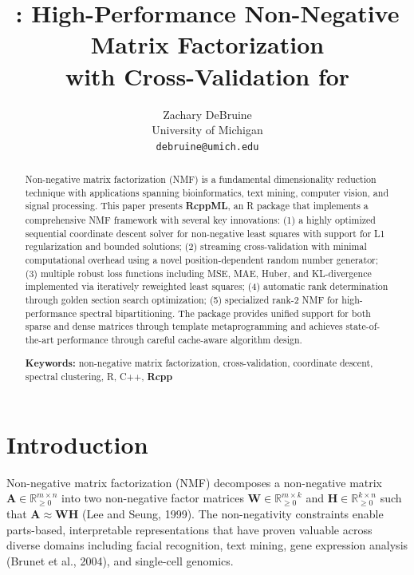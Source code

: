 \documentclass[11pt]{article}
\title{\pkg{RcppML}: High-Performance Non-Negative Matrix Factorization\\
with Cross-Validation for \proglang{R}}
\author{Zachary DeBruine\\
University of Michigan\\
\texttt{debruine@umich.edu}}
\date{}
\newcommand{\proglang}[1]{\textsf{#1}}
\newcommand{\pkg}[1]{\textbf{#1}}
\begin{document}
\maketitle

\begin{abstract}
Non-negative matrix factorization (NMF) is a fundamental dimensionality 
reduction technique with applications spanning bioinformatics, text mining, 
computer vision, and signal processing. This paper presents \pkg{RcppML}, an 
\proglang{R} package that implements a comprehensive NMF framework with several 
key innovations: (1) a highly optimized sequential coordinate descent solver for 
non-negative least squares with support for L1 regularization and bounded 
solutions; (2) streaming cross-validation with minimal computational overhead 
using a novel position-dependent random number generator; (3) multiple robust 
loss functions including MSE, MAE, Huber, and KL-divergence implemented via 
iteratively reweighted least squares; (4) automatic rank determination through 
golden section search optimization; (5) specialized rank-2 NMF for 
high-performance spectral bipartitioning. The package provides unified support 
for both sparse and dense matrices through template metaprogramming and achieves 
state-of-the-art performance through careful cache-aware algorithm design.

\vspace{1em}
\noindent\textbf{Keywords:} non-negative matrix factorization, cross-validation, coordinate 
descent, spectral clustering, \proglang{R}, \proglang{C++}, \pkg{Rcpp}
\end{abstract}


\section{Introduction}

Non-negative matrix factorization (NMF) decomposes a non-negative matrix 
$\mathbf{A} \in \mathbb{R}_{\geq 0}^{m \times n}$ into two non-negative factor 
matrices $\mathbf{W} \in \mathbb{R}_{\geq 0}^{m \times k}$ and 
$\mathbf{H} \in \mathbb{R}_{\geq 0}^{k \times n}$ such that 
$\mathbf{A} \approx \mathbf{W}\mathbf{H}$ (Lee and Seung, 1999). The non-negativity 
constraints enable parts-based, interpretable representations that have proven 
valuable across diverse domains including facial recognition, text mining, gene 
expression analysis (Brunet et al., 2004), and single-cell genomics.
\end{document}
